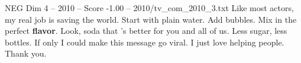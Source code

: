 \begin{textsample}{NEG Dim 4 – 2010 – Score -1.00 – 2010/tv\_com\_2010\_3.txt}  \label{ex:f4_neg_049}
Like most actors, my real job is saving the world.
Start with plain water.
Add bubbles.
Mix in the perfect \textbf{flavor}.
Look, soda that 's better for you and all of us.
Less sugar, less bottles.
If only I could make this message go viral.
I just love helping people.
Thank you.

\end{textsample}
